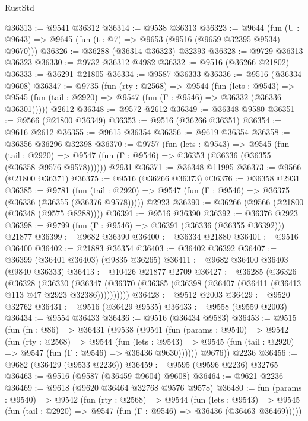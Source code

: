 \begin{lexlean}{RustStd}
\begin{coremodule}
@36313 := @9541 @36312
@36314 := @9538 @36313
@36323 := @9644
    (fun (U : @9643) => @9645 (fun (t : @7) => @9653 (@9516 (@9659 @32395 @9534) @9670)))
@36326 := @36288 (@36314 @36323) @32393
@36328 := @9729 @36313 @36323
@36330 := @9732 @36312 @4982
@36332 := @9516 (@36266 @21802)
@36333 := @36291 @21805
@36334 := @9587 @36333
@36336 := @9516 (@36334 @9608)
@36347 := @9735
    (fun (rty : @2568) =>
    @9544
      (fun (lets : @9543) =>
      @9545 (fun (tail : @2920) => @9547 (fun (Γ : @9546) => @36332 (@36336 @36301)))))
    @2612
@36348 := @9572 @2612
@36349 := @36348 @9580
@36351 := @9566 (@21800 @36349)
@36353 := @9516 (@36266 @36351)
@36354 := @9616 @2612
@36355 := @9615 @36354
@36356 := @9619 @36354
@36358 := @36356 @36296 @32398
@36370 := @9757
    (fun (lets : @9543) =>
    @9545
      (fun (tail : @2920) =>
      @9547 (fun (Γ : @9546) => @36353 (@36336 (@36355 (@36358 @9576 @9578))))))
    @2931
@36371 := @36348 @11995
@36373 := @9566 (@21800 @36371)
@36375 := @9516 (@36266 @36373)
@36376 := @36358 @2931
@36385 := @9781
    (fun (tail : @2920) => @9547 (fun (Γ : @9546) => @36375 (@36336 (@36355 (@36376 @9578)))))
    @2923
@36390 := @36266 (@9566 (@21800 (@36348 (@9575 @8288))))
@36391 := @9516 @36390
@36392 := @36376 @2923
@36398 := @9799 (fun (Γ : @9546) => @36391 (@36336 (@36355 @36392))) @21877
@36399 := @9682 @36390
@36400 := @36334 @21880
@36401 := @9516 @36400
@36402 := @21883 @36354
@36403 := @36402 @36392
@36407 := @36399 (@36401 @36403) (@9835 @36265)
@36411 := @9682 @36400 @36403 (@9840 @36333)
@36413 := @10426 @21877 @2709
@36427 := @36285
    (@36326
      (@36328
        (@36330
          (@36347 (@36370 (@36385 (@36398 (@36407 (@36411 (@36413 @113 @47 @2923 @32386))))))))))
@36428 := @9512 @2003
@36429 := @9520 @32762
@36431 := @9516 (@36429 @9535)
@36433 := @9558 (@9559 @2003)
@36434 := @9554 @36433
@36436 := @9516 (@36434 @9583)
@36453 := @9515
    (fun (fn : @86) =>
    @36431
      (@9538
        (@9541
          (fun (params : @9540) =>
          @9542
            (fun (rty : @2568) =>
            @9544
              (fun (lets : @9543) =>
              @9545 (fun (tail : @2920) => @9547 (fun (Γ : @9546) => @36436 @9630))))))
        @9676))
    @2236
@36456 := @9682 (@36429 (@9533 @2236))
@36459 := @9595 (@9596 @2236) @32765
@36463 := @9516 (@9587 (@36459 @9604) @9608)
@36464 := @9621 @2236
@36469 := @9618 (@9620 @36464 @32768 @9576 @9578)
@36480 := fun (params : @9540) =>
  @9542
    (fun (rty : @2568) =>
    @9544
      (fun (lets : @9543) =>
      @9545 (fun (tail : @2920) => @9547 (fun (Γ : @9546) => @36436 (@36463 @36469)))))

\end{coremodule}
\end{lexlean}

